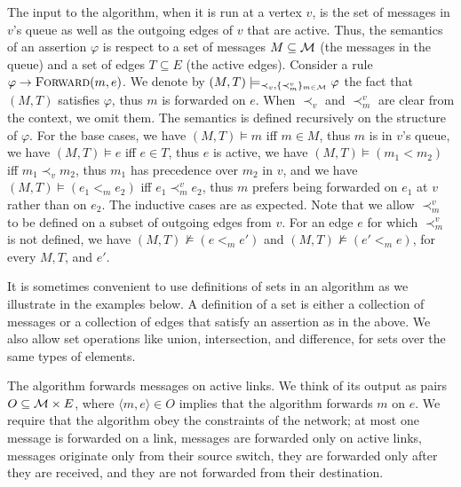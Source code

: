 \documentclass[11pt,eepic]{article}
\newcommand{\zug}[1]{\langle #1  \rangle}
\newcommand{\set}[1]{\{ #1  \}}
\newcommand{\M}{{\cal M}}
\newcommand{\Forw}{\mbox{\sc Forward}}
\begin{document}
		The input to the algorithm, when it is run at a vertex $v$, is the set of messages in $v$'s queue as well as the outgoing edges of $v$ that are active. Thus, the semantics of an assertion $\varphi$ is respect to a set of messages $M \subseteq \M$ (the messages in the queue) and a set of edges $T \subseteq E$ (the active edges). Consider a rule $\varphi \rightarrow \Forw(m,e)$. We denote by $(M, T) \models_{\prec_v, \set{\prec_m^v}_{m \in \M}} \varphi$ the fact that $(M,T)$ satisfies $\varphi$, thus $m$ is forwarded on $e$. When $\prec_v$ and $\prec_m^v$ are clear from the context, we omit them. The semantics is defined recursively on the structure of $\varphi$. For the base cases, we have $(M, T) \models m$ iff $m \in M$, thus $m$ is in $v$'s queue, we have $(M,T) \models e$ iff $e \in T$, thus $e$ is active, we have $(M,T) \models (m_1 < m_2)$ iff $m_1 \prec_v m_2$, thus $m_1$ has precedence over $m_2$ in $v$, and we have $(M,T) \models (e_1 <_m e_2)$ iff $e_1 \prec_m^v e_2$, thus $m$ prefers being forwarded on $e_1$ at $v$ rather than on $e_2$. The inductive cases are as expected. Note that we allow $\prec_m^v$ to be defined on a subset of outgoing edges from $v$. For an edge $e$ for which $\prec_m^v$ is not defined, we have $(M,T) \not \models (e <_m e')$ and $(M,T) \not \models (e' <_m e)$, for every $M, T$, and $e'$.

		It is sometimes convenient to use definitions of sets in an algorithm as we illustrate in the examples below. A definition of a set is either a collection of messages or a collection of edges that satisfy an assertion as in the above. We also allow set operations like union, intersection, and difference, for sets over the same types of elements.

		The algorithm forwards messages on active links. We think of its output as pairs $O \subseteq \M \times E$, where $\zug{m, e} \in O$ implies that the algorithm forwards $m$ on $e$. We require that the algorithm obey the constraints of the network; at most one message is forwarded on a link, messages are forwarded only on active links, messages originate only from their source switch, they are forwarded only after they are received, and they are not forwarded from their destination.
\end{document}
